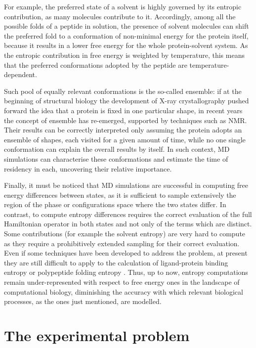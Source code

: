 For example, the preferred state of a solvent is highly governed by its entropic contribution, as many molecules contribute to it. Accordingly, among all the possible folds of a peptide in solution, the presence of solvent molecules can shift the preferred fold to a conformation of non-minimal energy for the protein itself, because it results in a lower free energy for the whole protein-solvent system.
%
As the entropic contribution in free energy is weighted by temperature, this means that the preferred conformations adopted by the peptide are temperature-dependent.

Such pool of equally relevant conformations is the so-called ensemble: if at the beginning of structural biology the development of X-ray crystallography pushed forward the idea that a protein is fixed in one particular shape, in recent years the concept of ensemble has re-emerged, supported by techniques such as NMR. Their results can be correctly interpreted only assuming the protein adopts an ensemble of shapes, each visited for a given amount of time, while no one single conformation can explain the overall results by itself. In such context, MD simulations can characterise these conformations and estimate the time of residency in each, uncovering their relative importance.

Finally, it must be noticed that MD simulations are successful in computing free energy differences between states, as it is sufficient to sample extensively the region of the phase or configurations space where the two states differ. In contrast, to compute entropy differences requires the correct evaluation of the full Hamiltonian operator in both states and not only of the terms which are distinct.
%
Some contributions (for example the solvent entropy) are very hard to compute as they require a prohibitively extended sampling for their correct evaluation.
%
Even if some techniques have been developed to address the problem, at present they are still difficult to apply to the calculation of ligand-protein binding entropy or polypeptide folding entropy \cite{Peter2004}. Thus, up to now, entropy computations remain under-represented with respect to free energy ones in the landscape of computational biology, diminishing the accuracy with which relevant biological processes, as the ones just mentioned, are modelled.


\section{The experimental problem}

